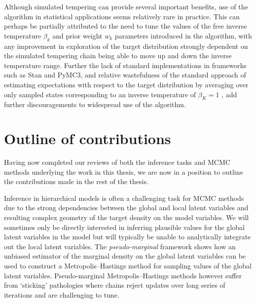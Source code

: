 Although simulated tempering can provide several important benefits, use of the algorithm in statistical applications seems relatively rare in practice. This can perhaps be partially attributed to the need to tune the values of the free inverse temperature $\beta_k$ and prior weight $w_k$ parameters introduced in the algorithm, with any improvement in exploration of the target distribution strongly dependent on the simulated tempering chain being able to move up and down the inverse temperature range. Further the lack of standard implementations in frameworks such as Stan and PyMC3, and relative wastefulness of the standard approach of estimating expectations with respect to the target distribution by averaging over only sampled states corresponding to an inverse temperature of $\beta_K = 1$%
, add further discouragements to widespread use of the algorithm.

\section{Outline of contributions}

Having now completed our reviews of both the inference tasks and \ac{MCMC} methods underlying the work in this thesis, we are now in a position to outline the contributions made in the rest of the thesis.

Inference in hierarchical models is often a challenging task for \ac{MCMC} methods due to the strong dependencies between the global and local latent variables and resulting complex geometry of the target density on the model variables. We will sometimes only be directly interested in inferring plausible values for the global latent variables in the model but will typically be unable to analytically integrate out the local latent variables. The \emph{pseudo-marginal} framework shows how an unbiased estimator of the marginal density on the global latent variables can be used to construct a Metropolis--Hastings method for sampling values of the global latent variables. Pseudo-marginal Metropolis--Hastings methods however suffer from `sticking' pathologies where chains reject updates over long series of iterations and are challenging to tune.

